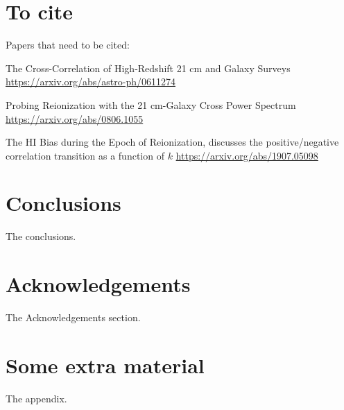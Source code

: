 \documentclass[a4paper,fleqn,usenatbib]{mnras}
\begin{document}
\section{To cite}
Papers that need to be cited:

The Cross-Correlation of High-Redshift 21 cm and Galaxy Surveys
\url{https://arxiv.org/abs/astro-ph/0611274}

Probing Reionization with the 21 cm-Galaxy Cross Power Spectrum
\url{https://arxiv.org/abs/0806.1055}

The HI Bias during the Epoch of Reionization, discusses the positive/negative
correlation transition as a function of $k$
\url{https://arxiv.org/abs/1907.05098}

\section{Conclusions}

The conclusions.

\section*{Acknowledgements}

The Acknowledgements section.






\appendix

\section{Some extra material}

The appendix.



\bsp	%
\label{lastpage}
\end{document}
